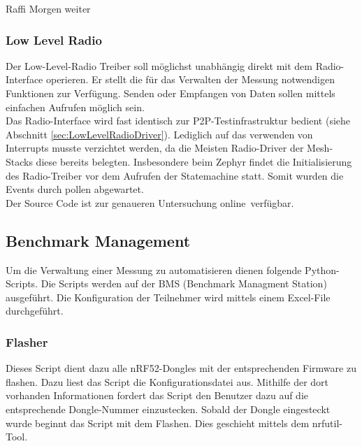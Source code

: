 Raffi Morgen weiter

\subsubsection{Low Level Radio}\label{subsubsec:LowLevelRadio}

Der Low-Level-Radio Treiber soll möglichst unabhängig direkt mit dem Radio-Interface operieren. Er stellt die für das Verwalten der Messung notwendigen Funktionen zur Verfügung. Senden oder Empfangen von Daten sollen mittels einfachen Aufrufen möglich sein. \\

Das Radio-Interface wird fast identisch zur P2P-Testinfrastruktur bedient (siehe Abschnitt \ref{sec:LowLevelRadioDriver}). Lediglich auf das verwenden von Interrupts musste verzichtet werden, da die Meisten Radio-Driver der Mesh-Stacks diese bereits belegten. Insbesondere beim Zephyr findet die Initialisierung des Radio-Treiber vor dem Aufrufen der Statemachine statt. Somit wurden die Events durch pollen abgewartet. \\

Der Source Code ist zur genaueren Untersuchung online\footnotemark\ verfügbar. 


\subsection{Benchmark Management}\label{subsec:Benchmark Management}

Um die Verwaltung einer Messung zu automatisieren dienen folgende Python-Scripts. Die Scripts werden auf der BMS (Benchmark Managment Station) ausgeführt. Die Konfiguration der Teilnehmer wird mittels einem Excel-File durchgeführt. 

\subsubsection{Flasher}\label{subsubsec:Flash}

Dieses Script dient dazu alle nRF52-Dongles mit der entsprechenden Firmware zu flashen. Dazu liest das Script die Konfigurationsdatei aus. Mithilfe der dort vorhanden Informationen fordert das Script den Benutzer dazu auf die entsprechende Dongle-Nummer einzustecken. Sobald der Dongle eingesteckt wurde beginnt das Script mit dem Flashen. Dies geschieht mittels dem nrfutil-Tool. 

